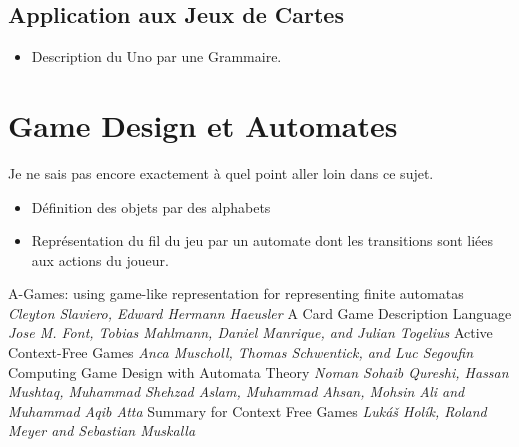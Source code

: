 \documentclass{cours}
\begin{document}
\subsection{Application aux Jeux de Cartes}
\begin{itemize}
    \item Description du Uno par une Grammaire.
\end{itemize}


\section{Game Design et Automates}
Je ne sais pas encore exactement à quel point aller loin dans ce sujet. 
\begin{itemize}
    \item Définition des objets par des alphabets
    \item Représentation du fil du jeu par un automate dont les transitions sont liées aux actions du joueur. 
\end{itemize}


\begin{thebibliography}{5}
     A-Games: using game-like representation for representing finite automatas \textit{Cleyton Slaviero, Edward Hermann Haeusler}
     A Card Game Description Language \textit{Jose M. Font, Tobias Mahlmann, Daniel Manrique, and Julian Togelius}
     Active Context-Free Games \textit{Anca Muscholl, Thomas Schwentick, and Luc Segoufin}
     Computing Game Design with Automata Theory \textit{Noman Sohaib Qureshi, Hassan Mushtaq, Muhammad Shehzad Aslam, Muhammad Ahsan, Mohsin Ali and Muhammad Aqib Atta}
     Summary for Context Free Games \textit{Lukáš Holík, Roland Meyer and Sebastian Muskalla}
\end{thebibliography}
\end{document}
